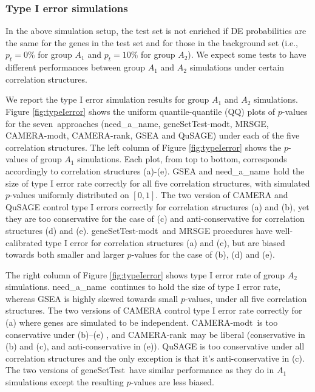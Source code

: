 \documentclass[useAMS,usenatbib, galley]{biom}
\newcommand{\OurMethod}{need\_a\_name}
\newcommand{\aaCase}{a}
\newcommand{\aCase}{b}
\newcommand{\cCase}{c}
\newcommand{\eCase}{d}
\newcommand{\fCase}{e}
\newcommand{\CMR}{CAMERA-rank}
\newcommand{\CMT}{CAMERA-modt}
\newcommand{\gent}{geneSetTest-modt}
\newcommand{\gen}{geneSetTest}
\begin{document}
	\subsubsection{Type I error simulations}\label{subsection:typeIerror}
	
	In the above simulation setup, the test set is not enriched if DE probabilities are the same for the genes in the test set and for those in the background set (i.e., $p_t =0\%$ for group $A_1$ and $p_t = 10\%$ for group $A_2$). We expect some tests to have different performances between group $A_1$ and $A_2$ simulations under certain correlation structures. 
	
	We report the type I error simulation results for group $A_1$ and $A_2$ simulations. Figure \ref{fig:typeIerror} shows the uniform quantile-quantile (QQ) plots of $p$-values for the seven~approaches (\OurMethod, \gent, MRSGE, \CMT, \CMR, GSEA and QuSAGE) under each of the five correlation structures. The left column of Figure \ref{fig:typeIerror} shows the $p$-values of group $A_1$ simulations. Each plot, from top to bottom, corresponds accordingly to correlation structures (\aaCase)-(\fCase). GSEA and \OurMethod~hold the size of type I error rate correctly for all five correlation structures, with simulated $p$-values uniformly distributed on $[0, 1]$. The two version of CAMERA and QuSAGE control type I errors correctly for correlation structures (\aaCase) and (\aCase), yet they are too conservative for the case of (\cCase) and anti-conservative for correlation structures (\eCase) and (\fCase). \gent~and MRSGE procedures have well-calibrated type I error for correlation structures (\aaCase) and (\cCase), but are biased towards both smaller and larger $p$-values for the case of (\aCase), (\eCase) and (\fCase). 
	
	The right column of Figure \ref{fig:typeIerror} shows type I error rate of group $A_2$ simulations. \OurMethod~continues to hold the size of type I error rate, whereas GSEA is highly skewed towards small $p$-values, under all five correlation structures. The two versions of CAMERA control type I error rate correctly for (\aaCase) where genes are simulated to be independent. \CMT~is too conservative under (\aCase)--(\fCase) , and \CMR~may be liberal (conservative in (\aCase) and (\cCase), and anti-conservative in (\fCase)). QuSAGE is too conservative under all correlation structures and the only exception is that it's anti-conservative in (\cCase). The two versions of \gen~have similar performance as they do in $A_1$ simulations except the resulting $p$-values are less biased.
	
\end{document}
